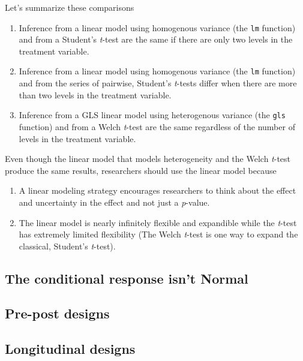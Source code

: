 \documentclass[]{book}
\providecommand{\tightlist}{%
  \setlength{\itemsep}{0pt}\setlength{\parskip}{0pt}}
\begin{document}
Let's summarize these comparisons

\begin{enumerate}
\def\labelenumi{\arabic{enumi}.}
\tightlist
\item
  Inference from a linear model using homogenous variance (the \texttt{lm} function) and from a Student's \emph{t}-test are the same if there are only two levels in the treatment variable.
\item
  Inference from a linear model using homogenous variance (the \texttt{lm} function) and from the series of pairwise, Student's \emph{t}-tests differ when there are more than two levels in the treatment variable.
\item
  Inference from a GLS linear model using heterogenous variance (the \texttt{gls} function) and from a Welch \emph{t}-test are the same regardless of the number of levels in the treatment variable.
\end{enumerate}

Even though the linear model that models heterogeneity and the Welch \emph{t}-test produce the same results, researchers should use the linear model because

\begin{enumerate}
\def\labelenumi{\arabic{enumi}.}
\tightlist
\item
  A linear modeling strategy encourages researchers to think about the effect and uncertainty in the effect and not just a \emph{p}-value.
\item
  The linear model is nearly infinitely flexible and expandible while the \emph{t}-test has extremely limited flexibility (The Welch \emph{t}-test is one way to expand the classical, Student's \emph{t}-test).
\end{enumerate}

\hypertarget{the-conditional-response-isnt-normal}{%
\subsection{The conditional response isn't Normal}\label{the-conditional-response-isnt-normal}}

\hypertarget{pre-post-designs}{%
\subsection{Pre-post designs}\label{pre-post-designs}}

\hypertarget{longitudinal-designs}{%
\subsection{Longitudinal designs}\label{longitudinal-designs}}
\end{document}
